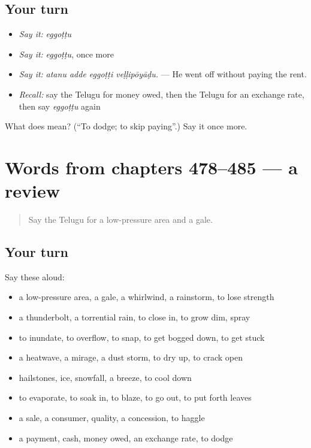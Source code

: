 \subsection*{Your turn}
\begin{itemize}
\raggedright
  \item \emph{Say it:} \emph{eggoṭṭu}
  \item \emph{Say it:} \emph{eggoṭṭu}, once more
  \item \emph{Say it:} \emph{atanu adde eggoṭṭi veḷḷipōyāḍu.} — He went off without paying the rent.
  \item \emph{Recall:} say the Telugu for money owed, then the Telugu for an exchange rate, then say \emph{eggoṭṭu} again
\end{itemize}

\begin{tcolorbox}[breakable,colback=teal!4,colframe=teal!35!black,title={Before you move on}]
What does  mean? (\textquotedblleft{}To dodge; to skip paying\textquotedblright{}.) Say it once more.
\end{tcolorbox}
\section[(dialogue)]{Words from chapters 478–485 — a review}

\label{lesson:TE-R485-review-478-485}



\begin{quote}
Say the Telugu for a low-pressure area and a gale.
\end{quote}

\subsection*{Your turn}
Say these aloud:

\begin{itemize}
\raggedright
  \item a low-pressure area, a gale, a whirlwind, a rainstorm, to lose strength
  \item a thunderbolt, a torrential rain, to close in, to grow dim, spray
  \item to inundate, to overflow, to snap, to get bogged down, to get stuck
  \item a heatwave, a mirage, a dust storm, to dry up, to crack open
  \item hailstones, ice, snowfall, a breeze, to cool down
  \item to evaporate, to soak in, to blaze, to go out, to put forth leaves
  \item a sale, a consumer, quality, a concession, to haggle
  \item a payment, cash, money owed, an exchange rate, to dodge
\end{itemize}

